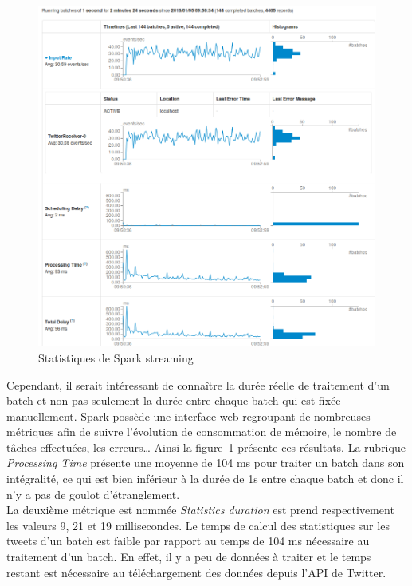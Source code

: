     \begin{figure}
      \centering
      \includegraphics[width=1.0\textwidth]{images/streaming_spark_ui.png}
      \caption{Statistiques de Spark streaming}
      \label{fig:statistiques_spark_streaming_ui}
    \end{figure}

    Cependant, il serait intéressant de connaître la durée réelle de traitement d'un batch et non pas seulement la durée entre chaque batch qui est fixée manuellement. Spark possède une interface web regroupant de nombreuses métriques afin de suivre l'évolution de consommation de mémoire, le nombre de tâches effectuées, les erreurs… Ainsi la figure~\ref{fig:statistiques_spark_streaming_ui} présente ces résultats. La rubrique \emph{Processing Time} présente une moyenne de 104 ms pour traiter un batch dans son intégralité, ce qui est bien inférieur à la durée de 1s entre chaque batch et donc il n'y a pas de goulot d'étranglement. \\

    La deuxième métrique est nommée \emph{Statistics duration} est prend respectivement les valeurs 9, 21 et 19 millisecondes. Le temps de calcul des statistiques sur les tweets d'un batch est faible par rapport au temps de 104 ms nécessaire au traitement d'un batch. En effet, il y a peu de données à traiter et le temps restant est nécessaire au téléchargement des données depuis l'API de Twitter.


